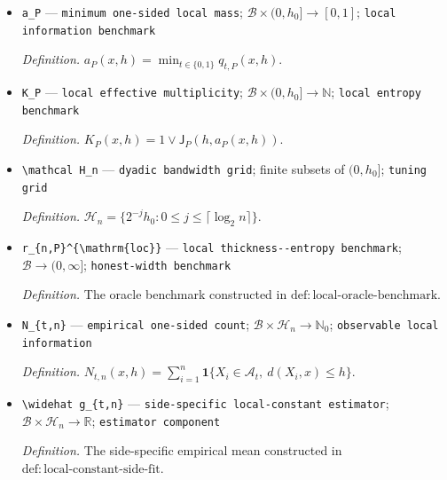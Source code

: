 \documentclass{article}
\begin{document}
\begin{itemize}
  \par\smallskip\noindent\emph{Definition.} \(\mathsf J_P(h,u)\) is the largest cardinality of an \(h\)-separated subset of \(\{x\in\mathcal B:\min_{t\in\{0,1\}}q_{t,P}(x,h)\le u\}\).
  \item \texttt{a\_\allowbreak{}P} --- \texttt{minimum one-\allowbreak{}sided local mass}; \(\mathcal B\times(0,h_0]\to[0,1]\); \texttt{local information benchmark}
  \par\smallskip\noindent\emph{Definition.} \(a_P(x,h)=\min_{t\in\{0,1\}}q_{t,P}(x,h)\).
  \item \texttt{K\_\allowbreak{}P} --- \texttt{local effective multiplicity}; \(\mathcal B\times(0,h_0]\to\mathbb N\); \texttt{local entropy benchmark}
  \par\smallskip\noindent\emph{Definition.} \(K_P(x,h)=1\vee\mathsf J_P(h,a_P(x,h))\).
  \item \texttt{\textbackslash{}\allowbreak{}mathcal H\_\allowbreak{}n} --- \texttt{dyadic bandwidth grid}; finite subsets of \((0,h_0]\); \texttt{tuning grid}
  \par\smallskip\noindent\emph{Definition.} \(\mathcal H_n=\{2^{-j}h_0:0\le j\le\lceil\log_2 n\rceil\}\).
  \item \texttt{r\_\allowbreak{}\{n,\allowbreak{}P\}\allowbreak{}\textasciicircum{}\{\textbackslash{}\allowbreak{}mathrm\{loc\}\allowbreak{}\}\allowbreak{}} --- \texttt{local thickness-\allowbreak{}-\allowbreak{}entropy benchmark}; \(\mathcal B\to(0,\infty]\); \texttt{honest-\allowbreak{}width benchmark}
  \par\smallskip\noindent\emph{Definition.} The oracle benchmark constructed in \(\mathrm{def:local\text{-}oracle\text{-}benchmark}\).
  \item \texttt{N\_\allowbreak{}\{t,\allowbreak{}n\}\allowbreak{}} --- \texttt{empirical one-\allowbreak{}sided count}; \(\mathcal B\times\mathcal H_n\to\mathbb N_0\); \texttt{observable local information}
  \par\smallskip\noindent\emph{Definition.} \(N_{t,n}(x,h)=\sum_{i=1}^n\mathbf 1\{X_i\in\mathcal A_t,\ d(X_i,x)\le h\}\).
  \item \texttt{\textbackslash{}\allowbreak{}widehat g\_\allowbreak{}\{t,\allowbreak{}n\}\allowbreak{}} --- \texttt{side-\allowbreak{}specific local-\allowbreak{}constant estimator}; \(\mathcal B\times\mathcal H_n\to\mathbb R\); \texttt{estimator component}
  \par\smallskip\noindent\emph{Definition.} The side-specific empirical mean constructed in \(\mathrm{def:local\text{-}constant\text{-}side\text{-}fit}\).

\end{itemize}
\end{document}
